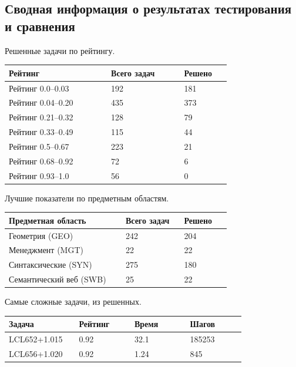 \subsection{Сводная информация о результатах тестирования и сравнения}

Решенные задачи по рейтингу.

\begin{longtable}[H]{|p{0.35\linewidth}|p{0.25\linewidth}|p{0.15\linewidth}|}
\hline
\textbf{Рейтинг} & \textbf{Всего задач} & \textbf{Решено} \\
\hline
Рейтинг 0.0--0.03 & 192 & 181 \\
\hline
Рейтинг 0.04--0.20 & 435 & 373 \\
\hline
Рейтинг 0.21--0.32 & 128 & 79 \\
\hline
Рейтинг 0.33--0.49 & 115 & 44 \\
\hline
Рейтинг 0.5--0.67 & 223 & 21 \\
\hline
Рейтинг 0.68--0.92 & 72 & 6 \\
\hline
Рейтинг 0.93--1.0 & 56 & 0\\
\hline
\end{longtable}


Лучшие показатели по предметным областям.

\begin{longtable}[H]{|p{0.4\linewidth}|p{0.2\linewidth}|p{0.15\linewidth}|}
\hline
\textbf{Предметная область} & \textbf{Всего задач} & \textbf{Решено} \\
\hline
Геометрия (GEO) & 242 & 204 \\
\hline
Менеджмент (MGT) & 22 & 22 \\
\hline
Синтаксические (SYN) & 275 & 180 \\
\hline
Семантический веб (SWB) & 25 & 22 \\
\hline
\end{longtable}


Самые сложные задачи, из решенных.

\begin{longtable}[H]{|p{0.2\linewidth}|p{0.2\linewidth}|p{0.2\linewidth}|p{0.2\linewidth}|}
\hline
\textbf{Задача} & \textbf{Рейтинг} & \textbf{Время} & \textbf{Шагов} \\
\hline 
LCL652+1.015 & 0.92 & 32.1 & 185253 \\
\hline
LCL656+1.020 & 0.92 & 1.24 & 845 \\
\hline
\end{longtable}



